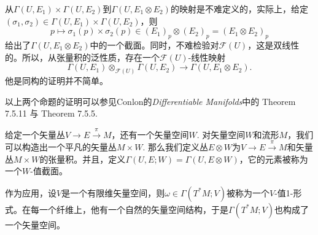 从$\Gamma(U,E_1)\times \Gamma(U,E_2)$到$\Gamma(U,E_1\otimes E_2)$的映射是不难定义的，实际上，给定$(\sigma_1,\sigma_2)\in \Gamma(U,E_1)\times \Gamma(U,E_2)$，则
\[
	p\mapsto \sigma_1(p)\times \sigma_2(p)\in (E_1)_p\otimes (E_2)_p=(E_1\otimes E_2)_p
\]
给出了$\Gamma(U,E_1\otimes E_2)$中的一个截面。同时，不难检验对$\mathcal{F}(U)$，这是双线性的。所以，从张量积的泛性质，存在一个$\mathcal{F}(U)$-线性映射
\[
	\Gamma(U,E_1)\otimes_{\mathcal{F}(U)} \Gamma(U,E_2)\to \Gamma(U,E_1\otimes E_2).
\]
他是同构的证明并不简单。

以上两个命题的证明可以参见Conlon的\textit{Differentiable Manifolds}中的 Theorem 7.5.11 与 Theorem 7.5.5.


\begin{para}[矢量值截面]
给定一个矢量丛$V\to E\xrightarrow{\pi} M$，还有一个矢量空间$W$. 对矢量空间$W$和流形$M$，我们可以构造出一个平凡的矢量丛$M\times W$. 那么我们定义丛$E\otimes W$为$V\to E\xrightarrow{\pi} M$和矢量丛$M\times W$的张量积。并且，定义$\Gamma(U,E;W)=\Gamma(U,E\otimes W)$，它的元素被称为一个$W$-值截面。
\end{para}

作为应用，设$V$是一个有限维矢量空间，则$\omega\in \Gamma(T^*M;V)$被称为一个$V$-值1-形式。在每一个纤维上，他有一个自然的矢量空间结构，于是$\Gamma(T^*M;V)$也构成了一个矢量空间。

